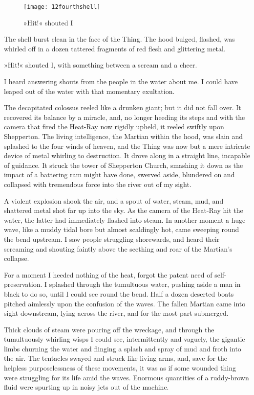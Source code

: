 \begin{figure}[tbp]
\centering
\texttt{[image: 12fourthshell]}
\caption{»Hit!« shouted I}
\end{figure}

The shell burst clean in the face of the Thing. The hood bulged, flashed, was whirled off in a dozen tattered fragments of red flesh and glittering metal.

»Hit!« shouted I, with something between a scream and a cheer.

I heard answering shouts from the people in the water about me. I could have leaped out of the water with that momentary exultation.

The decapitated colossus reeled like a drunken giant; but it did not fall over. It recovered its balance by a miracle, and, no longer heeding its steps and with the camera that fired the Heat-Ray now rigidly upheld, it reeled swiftly upon Shepperton. The living intelligence, the Martian within the hood, was slain and splashed to the four winds of heaven, and the Thing was now but a mere intricate device of metal whirling to destruction. It drove along in a straight line, incapable of guidance. It struck the tower of Shepperton Church, smashing it down as the impact of a battering ram might have done, swerved aside, blundered on and collapsed with tremendous force into the river out of my sight.

A violent explosion shook the air, and a spout of water, steam, mud, and shattered metal shot far up into the sky. As the camera of the Heat-Ray hit the water, the latter had immediately flashed into steam. In another moment a huge wave, like a muddy tidal bore but almost scaldingly hot, came sweeping round the bend upstream. I saw people struggling shorewards, and heard their screaming and shouting faintly above the seething and roar of the Martian's collapse.

For a moment I heeded nothing of the heat, forgot the patent need of self-preservation. I splashed through the tumultuous water, pushing aside a man in black to do so, until I could see round the bend. Half a dozen deserted boats pitched aimlessly upon the confusion of the waves. The fallen Martian came into sight downstream, lying across the river, and for the most part submerged.

Thick clouds of steam were pouring off the wreckage, and through the tumultuously whirling wisps I could see, intermittently and vaguely, the gigantic limbs churning the water and flinging a splash and spray of mud and froth into the air. The tentacles swayed and struck like living arms, and, save for the helpless purposelessness of these movements, it was as if some wounded thing were struggling for its life amid the waves. Enormous quantities of a ruddy-brown fluid were spurting up in noisy jets out of the machine.

